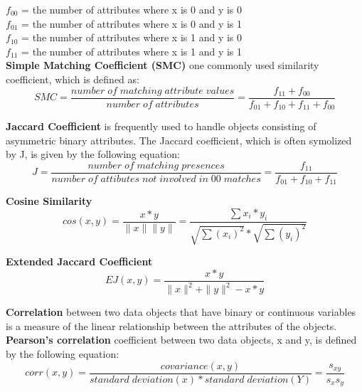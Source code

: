		$f_{00}$ = the number of attributes where x is 0 and y is 0 \\
		$f_{01}$ = the number of attributes where x is 0 and y is 1 \\
		$f_{10}$ = the number of attributes where x is 1 and y is 0 \\
		$f_{11}$ = the number of attributes where x is 1 and y is 1 \\

	{\bf Simple Matching Coefficient (SMC)} one commonly used similarity coefficient, 
	which is defined as: \\

		\begin{equation}
		SMC = \frac{number\;of\;matching\;attribute\;values}{number\;of\;attributes} = 
		\frac{f_{11} + f_{00}}{f_{01} + f_{10} + f_{11} + f_{00}}
		\end{equation}


	{\bf Jaccard Coefficient} is frequently used to handle objects consisting of 
	asymmetric binary attributes. The Jaccard coefficient, which is often symolized by J, 
	is given by the following equation: \\

		\begin{equation}
			J = \frac{number\;of\;matching\;presences}{number\;of\;attibutes\;not\;involved\;in\;00\;matches} =
			\frac{f_{11}}{f_{01} + f_{10} + f_{11}}
		\end{equation}

	{\bf Cosine Similarity} \\ 

		\begin{equation}
		cos(x,y) = \frac{x*y}{\|x\| \|y\|} = \frac{\sum x_{i}*y_{i}}{\sqrt{\sum(x_{i})^2} * \sqrt{\sum(y_{i})^{2}}}
		\end{equation}

	{\bf Extended Jaccard Coefficient} \\

		\begin{equation}
			EJ(x,y) = \frac{x*y}{\|x\|^{2} + \|y\|^{2} - x*y}
		\end{equation}

	{\bf Correlation} between two data objects that have binary or continuous variables is a
	measure of the linear relationship between the attributes of the objects. 
	{\bf Pearson's correlation} coefficient between two data objects, x and y, is defined
	by the following equation: \\

		\begin{equation}
		corr(x,y) = \frac{covariance(x,y)}{standard\;deviation(x)*standard\;deviation(Y)} = 
		\frac{s_{xy}}{s_{x}s_{y}}
		\end{equation}


	


